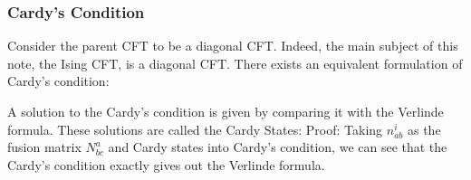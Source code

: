 \subsubsection{Cardy's Condition}

Consider the parent CFT to be a diagonal CFT. Indeed, the main subject of this note, the Ising CFT, is a diagonal CFT. There exists an equivalent formulation of Cardy’s condition:
%

A solution to the Cardy's condition is given by comparing it with the Verlinde formula. These solutions are called the Cardy States:
Proof: Taking $ n_{ab}^i $ as the fusion matrix $ N^a_{bc} $ and Cardy states into Cardy's condition, we can see that the Cardy's condition exactly gives out the Verlinde formula.

